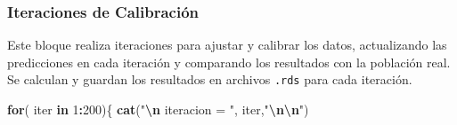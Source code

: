 \documentclass[
  12pt,
]{book}
\newenvironment{Shaded}{\begin{snugshade}}{\end{snugshade}}
\newcommand{\ControlFlowTok}[1]{\textcolor[rgb]{0.13,0.29,0.53}{\textbf{#1}}}
\newcommand{\DecValTok}[1]{\textcolor[rgb]{0.00,0.00,0.81}{#1}}
\newcommand{\FunctionTok}[1]{\textcolor[rgb]{0.13,0.29,0.53}{\textbf{#1}}}
\newcommand{\NormalTok}[1]{#1}
\newcommand{\SpecialCharTok}[1]{\textcolor[rgb]{0.81,0.36,0.00}{\textbf{#1}}}
\newcommand{\StringTok}[1]{\textcolor[rgb]{0.31,0.60,0.02}{#1}}
\begin{document}
\hypertarget{iteraciones-de-calibraciuxf3n}{%
\subsubsection*{Iteraciones de Calibración}\label{iteraciones-de-calibraciuxf3n}}

Este bloque realiza iteraciones para ajustar y calibrar los datos, actualizando las predicciones en cada iteración y comparando los resultados con la población real. Se calculan y guardan los resultados en archivos \texttt{.rds} para cada iteración.

\begin{Shaded}
\begin{Highlighting}[]
\ControlFlowTok{for}\NormalTok{( iter }\ControlFlowTok{in} \DecValTok{1}\SpecialCharTok{:}\DecValTok{200}\NormalTok{)\{}
  \FunctionTok{cat}\NormalTok{(}\StringTok{"}\SpecialCharTok{\textbackslash{}n}\StringTok{ iteracion = "}\NormalTok{, iter,}\StringTok{"}\SpecialCharTok{\textbackslash{}n\textbackslash{}n}\StringTok{"}\NormalTok{)    }
  

\end{Highlighting}
\end{Shaded}
\end{document}
